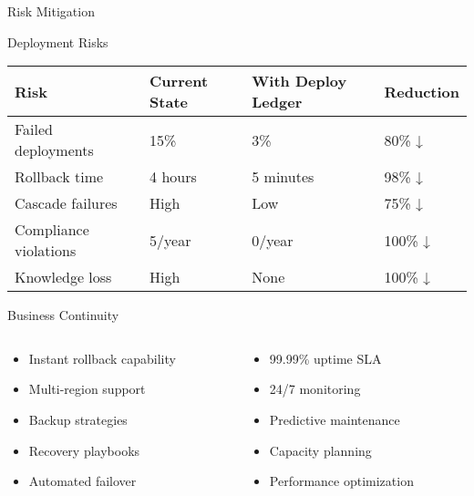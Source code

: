 \documentclass[presentation,aspectratio=169]{beamer}
\begin{document}
\begin{frame}[label={sec:org4e74d25}]{Risk Mitigation}
\begin{block}{Deployment Risks}
\begin{center}
\begin{tabular}{llll}
Risk & Current State & With Deploy Ledger & Reduction\\
\hline
Failed deployments & 15\% & 3\% & 80\% ↓\\
Rollback time & 4 hours & 5 minutes & 98\% ↓\\
Cascade failures & High & Low & 75\% ↓\\
Compliance violations & 5/year & 0/year & 100\% ↓\\
Knowledge loss & High & None & 100\% ↓\\
\end{tabular}
\end{center}
\end{block}
\begin{block}{Business Continuity}
\begin{columns}
\begin{column}{0.5\columnwidth}
\begin{itemize}
\item Instant rollback capability
\item Multi-region support
\item Backup strategies
\item Recovery playbooks
\item Automated failover
\end{itemize}
\end{column}
\begin{column}{0.5\columnwidth}
\begin{itemize}
\item 99.99\% uptime SLA
\item 24/7 monitoring
\item Predictive maintenance
\item Capacity planning
\item Performance optimization
\end{itemize}
\end{column}
\end{columns}
\end{block}
\end{frame}
\end{document}
